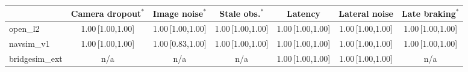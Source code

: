 \begin{tabular}{@{}lcccccc@{}}
\toprule
 & Camera dropout$^{\ast}$ & Image noise$^{\ast}$ & Stale obs.$^{\ast}$ & Latency & Lateral noise & Late braking$^{\ast}$ \\
\midrule
open\_l2 & 1.00\,{\scriptsize[1.00,1.00]} & 1.00\,{\scriptsize[1.00,1.00]} & 1.00\,{\scriptsize[1.00,1.00]} & 1.00\,{\scriptsize[1.00,1.00]} & 1.00\,{\scriptsize[1.00,1.00]} & 1.00\,{\scriptsize[1.00,1.00]} \\
navsim\_v1 & 1.00\,{\scriptsize[1.00,1.00]} & 1.00\,{\scriptsize[0.83,1.00]} & 1.00\,{\scriptsize[1.00,1.00]} & 1.00\,{\scriptsize[1.00,1.00]} & 1.00\,{\scriptsize[1.00,1.00]} & 1.00\,{\scriptsize[1.00,1.00]} \\
bridgesim\_ext & n/a & n/a & n/a & 1.00\,{\scriptsize[1.00,1.00]} & 1.00\,{\scriptsize[1.00,1.00]} & n/a \\
\bottomrule
\end{tabular}
